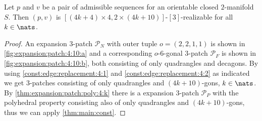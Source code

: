 \clearpage
\begin{theorem}
  Let $p$ and $v$ be a pair of admissible sequences for an orientable closed $2$-manifold $S$. Then $(p, v)$ is $[(4k + 4) \times 4, 2 \times (4k+10)]$-$[3]$-realizable for all $k \in \nats$.
  \begin{proof}
    An expansion $3$-patch $\mathcal{P}_N$ with outer tuple $o = (2, 2, 1, 1)$ is shown in \autoref{fig:expansion:patch:4:10:a} and a corresponding $o$-$6$-gonal $3$-patch $\mathcal{P}_F$ is shown in \autoref{fig:expansion:patch:4:10:b}, both consisting of only quadrangles and decagons. By using \autoref{const:edge:replacement:4:1} and \autoref{const:edge:replacement:4:2} as indicated we get $3$-patches consisting of only quadrangles and $(4k+10)$-gons, $k \in \nats$. By \autoref{thm:expansion:patch:poly:4:k} there is a expansion $3$-patch $\mathcal{P}_P$ with the polyhedral property consisting also of only quadrangles and $(4k+10)$-gons, thus we can apply \autoref{thm:main:const}.
  \end{proof}
\end{theorem}
{\par\vspace*{\fill}}
